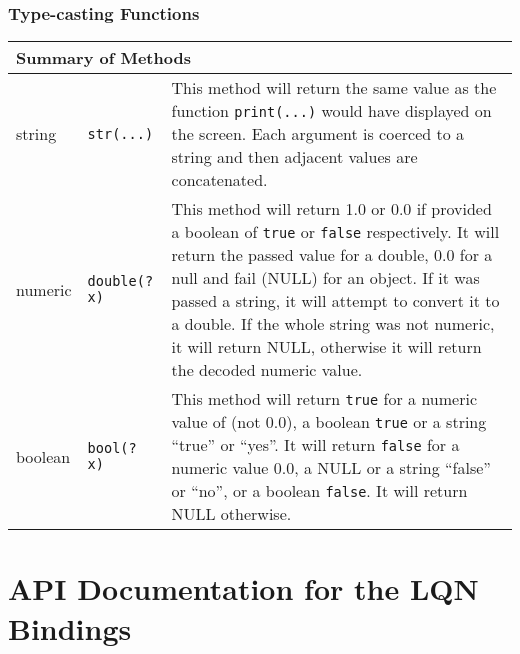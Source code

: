 \subsubsection{Type-casting Functions}

\begin{tabular}{|p{0.8in}|p{2.2in}||p{3in}|}
  \hline
  \multicolumn{3}{|l|}{\textbf{Summary of Methods}}\\
  \hline
  string & {\tt str(...)} & This method will return the same value as the function {\tt print(...)}
  would have displayed on the screen. Each argument is coerced to a string and then adjacent
  values are concatenated.\\
  numeric & {\tt double(? x)} & This method will return 1.0 or 0.0 if provided a boolean of
  {\tt true} or {\tt false} respectively. It will return the passed value for a double,
  0.0 for a null and fail (NULL) for an object. If it was passed a string, it will attempt
  to convert it to a double. If the whole string was not numeric, it will return NULL, otherwise
  it will return the decoded numeric value.\\
  boolean & {\tt bool(? x)} & This method will return {\tt true} for a numeric value of (not 0.0), a
  boolean {\tt true} or a string ``true'' or ``yes''. It will return {\tt false} for a numeric
  value 0.0, a NULL or a string ``false'' or ``no'', or a boolean {\tt false}. It will
  return NULL otherwise.\\
  \hline
\end{tabular}


\section{API Documentation for the LQN Bindings}

